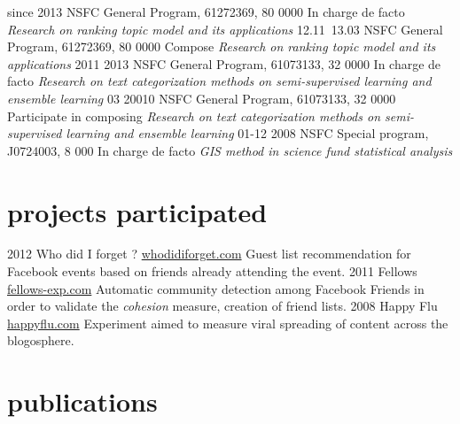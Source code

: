\documentclass[]{friggeri-cv}
\begin{document}
\begin{entrylist}
  \entry
    {since 2013}
    {NSFC General Program, 61272369, 80 0000}
    {In charge de facto}
    {\emph{Research on ranking topic model and its applications}}
  \entry
    {12.11~13.03}
    {NSFC General Program, 61272369, 80 0000}
    {Compose}
    {\emph{Research on ranking topic model and its applications}}
  \entry
    {2011 2013}
    {NSFC General Program, 61073133, 32 0000}
    {In charge de facto}
    {\emph{Research on text categorization methods on semi-supervised learning
    and ensemble learning}}
  \entry
    {03 20010}
    {NSFC General Program, 61073133, 32 0000}
    {Participate in composing}
    {\emph{Research on text categorization methods on semi-supervised learning
    and ensemble learning}}
  \entry
    {01-12 2008}
    {NSFC Special program, J0724003, 8 000}
    {In charge de facto}
    {\emph{GIS method in science fund statistical analysis}}
\end{entrylist}

\section{projects participated}

\begin{entrylist}
  \entry
    {2012}
    {Who did I forget ?}
    {\href{http://whodidiforget.com}{whodidiforget.com}}
    {Guest list recommendation for Facebook events based on friends already attending the event.}
  \entry
    {2011}
    {Fellows}
    {\href{http://fellows-exp.com}{fellows-exp.com}}
    {Automatic community detection among Facebook Friends in order to validate the \emph{cohesion} measure, creation of friend lists.}
  \entry
    {2008}
    {Happy Flu}
    {\href{http://happyflu.com}{happyflu.com}}
    {Experiment aimed to measure viral spreading of content across the blogosphere.}
\end{entrylist}

\section{publications}


\begin{refsection}
  \nocite{*}
  \printbibliography[sorting=chronological, type=inproceedings, title={international peer-reviewed conferences/proceedings}, notkeyword={france}, heading=subbibliography]
\end{refsection}
\begin{refsection}
  \nocite{*}
  \printbibliography[sorting=chronological, type=inproceedings, title={local peer-reviewed conferences/proceedings}, keyword={france}, heading=subbibliography]
\end{refsection}
\end{document}
